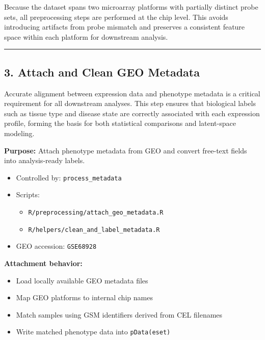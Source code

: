 \documentclass[
  letterpaper,
  DIV=11,
  numbers=noendperiod,
  openany,
  oneside]{scrreprt}
\providecommand{\tightlist}{%
  \setlength{\itemsep}{0pt}\setlength{\parskip}{0pt}}
\begin{document}
Because the dataset spans two microarray platforms with partially
distinct probe sets, all preprocessing steps are performed at the chip
level. This avoids introducing artifacts from probe mismatch and
preserves a consistent feature space within each platform for downstream
analysis.

\begin{center}\rule{0.5\linewidth}{0.5pt}\end{center}

\subsection*{3. Attach and Clean GEO
Metadata}\label{attach-and-clean-geo-metadata}

Accurate alignment between expression data and phenotype metadata is a
critical requirement for all downstream analyses. This step ensures that
biological labels such as tissue type and disease state are correctly
associated with each expression profile, forming the basis for both
statistical comparisons and latent-space modeling.

\textbf{Purpose:} Attach phenotype metadata from GEO and convert
free-text fields into analysis-ready labels.

\begin{itemize}
\tightlist
\item
  Controlled by: \texttt{process\_metadata}
\item
  Scripts:

  \begin{itemize}
  \tightlist
  \item
    \texttt{R/preprocessing/attach\_geo\_metadata.R}
  \item
    \texttt{R/helpers/clean\_and\_label\_metadata.R}
  \end{itemize}
\item
  GEO accession: \texttt{GSE68928}
\end{itemize}

\textbf{Attachment behavior:}

\begin{itemize}
\tightlist
\item
  Load locally available GEO metadata files
\item
  Map GEO platforms to internal chip names
\item
  Match samples using GSM identifiers derived from CEL filenames
\item
  Write matched phenotype data into \texttt{pData(eset)}
\end{itemize}
\end{document}

